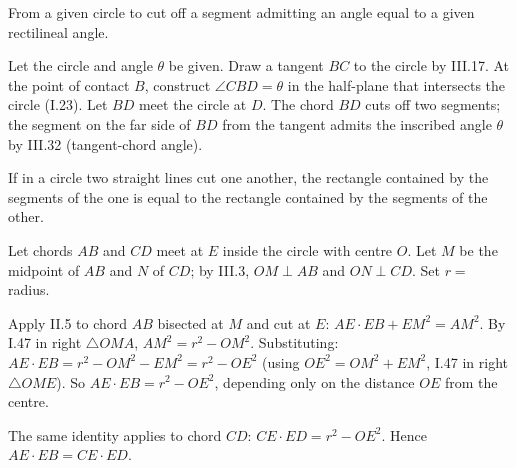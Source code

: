 \documentclass{rrxiv}
\begin{document}
\begin{claim}
\label{prop:III.34}
From a given circle to cut off a segment admitting an angle equal to
a given rectilineal angle.
\end{claim}
\begin{evidence}
\label{ev:III.34}
Let the circle and angle $\theta$ be given.  Draw a tangent $BC$
to the circle by III.17.  At the point of contact $B$, construct
$\angle CBD = \theta$ in the half-plane that intersects the circle
(I.23).  Let $BD$ meet the circle at $D$.  The chord $BD$ cuts off
two segments; the segment on the far side of $BD$ from the tangent
admits the inscribed angle $\theta$ by III.32 (tangent-chord
angle).
\end{evidence}

\begin{claim}
\label{prop:III.35}
If in a circle two straight lines cut one another, the rectangle
contained by the segments of the one is equal to the rectangle
contained by the segments of the other.
\end{claim}
\begin{evidence}
\label{ev:III.35}
Let chords $AB$ and $CD$ meet at $E$ inside the circle with centre
$O$.  Let $M$ be the midpoint of $AB$ and $N$ of $CD$; by III.3,
$OM \perp AB$ and $ON \perp CD$.  Set $r = $ radius.

Apply II.5 to chord $AB$ bisected at $M$ and cut at $E$: $AE
\cdot EB + EM^2 = AM^2$.  By I.47 in right $\triangle OMA$,
$AM^2 = r^2 - OM^2$.  Substituting: $AE\cdot EB = r^2 - OM^2 -
EM^2 = r^2 - OE^2$ (using $OE^2 = OM^2 + EM^2$, I.47 in right
$\triangle OME$).  So $AE \cdot EB = r^2 - OE^2$, depending only
on the distance $OE$ from the centre.

The same identity applies to chord $CD$: $CE \cdot ED = r^2 -
OE^2$.  Hence $AE \cdot EB = CE \cdot ED$.
\end{evidence}
\end{document}
